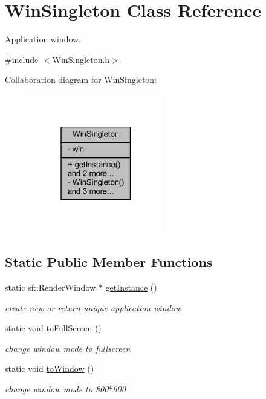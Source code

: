\hypertarget{class_win_singleton}{}\section{Win\+Singleton Class Reference}
\label{class_win_singleton}


Application window.  




{\ttfamily \#include $<$Win\+Singleton.\+h$>$}



Collaboration diagram for Win\+Singleton\+:\nopagebreak
\begin{figure}[H]
\begin{center}
\leavevmode
\includegraphics[width=166pt]{class_win_singleton__coll__graph}
\end{center}
\end{figure}
\subsection*{Static Public Member Functions}
\begin{DoxyCompactItemize}
\item 
static sf\+::\+Render\+Window $\ast$ \hyperlink{class_win_singleton_a82935bb60c8e4bb14350ac45813b33ca}{get\+Instance} ()
\begin{DoxyCompactList}\small\item\em create new or return unique application window \end{DoxyCompactList}\item 
\mbox{\label{class_win_singleton_a58684b65df9dadcdc798faba86aeb0b6}} 
static void \hyperlink{class_win_singleton_a58684b65df9dadcdc798faba86aeb0b6}{to\+Full\+Screen} ()
\begin{DoxyCompactList}\small\item\em change window mode to fullscreen \end{DoxyCompactList}\item 
\mbox{\label{class_win_singleton_abba34d9cbdf6a9ff14da654b2b88aba3}} 
static void \hyperlink{class_win_singleton_abba34d9cbdf6a9ff14da654b2b88aba3}{to\+Window} ()
\begin{DoxyCompactList}\small\item\em change window mode to 800$\ast$600 \end{DoxyCompactList}\end{DoxyCompactItemize}
